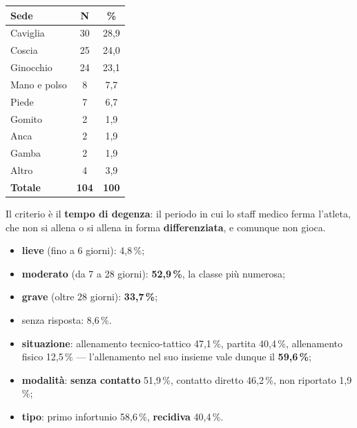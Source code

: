 \begin{table}[htbp]
  \centering
  \small
  \renewcommand{\arraystretch}{1.3}
  \begin{tabularx}{\textwidth}{|X|c|c|}
    \hline
    \textbf{Sede} & \textbf{N} & \textbf{\%} \\
    \hline
    Caviglia & 30 & 28,9 \\
    \hline
    Coscia & 25 & 24,0 \\
    \hline
    Ginocchio & 24 & 23,1 \\
    \hline
    Mano e polso & 8 & 7,7 \\
    \hline
    Piede & 7 & 6,7 \\
    \hline
    Gomito & 2 & 1,9 \\
    \hline
    Anca & 2 & 1,9 \\
    \hline
    Gamba & 2 & 1,9 \\
    \hline
    Altro & 4 & 3,9 \\
    \hline
    \textbf{Totale} & \textbf{104} & \textbf{100} \\
    \hline
  \end{tabularx}
\end{table}

Il criterio è il \textbf{tempo di degenza}: il periodo in cui lo staff medico ferma l'atleta, che
non si allena o si allena in forma \textbf{differenziata}, e comunque non gioca.
\begin{itemize}
  \item \textbf{lieve} (fino a 6 giorni): 4,8\,\%;
  \item \textbf{moderato} (da 7 a 28 giorni): \textbf{52,9\,\%}, la classe più numerosa;
  \item \textbf{grave} (oltre 28 giorni): \textbf{33,7\,\%};
  \item senza risposta: 8,6\,\%.
\end{itemize}

\begin{itemize}
  \item \textbf{situazione}: allenamento tecnico-tattico 47,1\,\%, partita 40,4\,\%, allenamento
    fisico 12,5\,\% --- l'allenamento nel suo insieme vale dunque il \textbf{59,6\,\%};
  \item \textbf{modalità}: \textbf{senza contatto} 51,9\,\%, contatto diretto 46,2\,\%, non
    riportato 1,9\,\%;
  \item \textbf{tipo}: primo infortunio 58,6\,\%, \textbf{recidiva} 40,4\,\%.
\end{itemize}

